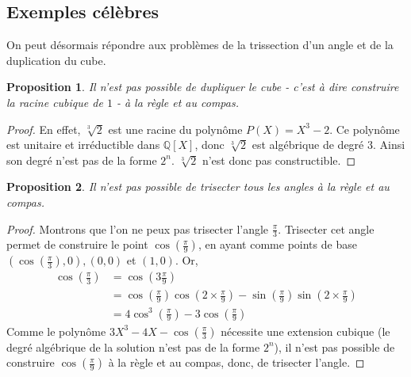 \documentclass[a4paper,12pt,french]{report}
\newtheorem{proposition}{Proposition}[section]
\begin{document}
	\subsection{Exemples célèbres}

		On peut désormais répondre aux problèmes de la trissection 
		d'un angle et de la duplication du cube.

	
	\begin{proposition}
		Il n'est pas possible de dupliquer le cube - c'est à dire construire la racine cubique de $1$ - à la règle et au compas.
	\end{proposition}
             
			\begin{proof}
			En effet, 
				\(\sqrt[3]{2}\) est une racine du polynôme 
				\(P(X)=X^{3}-2\). Ce polynôme est unitaire et 
				irréductible dans \(\mathbb{Q}[X]\), donc \(\sqrt[3]{2}\) 
				est algébrique de degré 3. Ainsi son degré n'est pas de 
				la forme \(2^{n}\). \(\sqrt[3]{2}\) n'est donc pas 
				constructible.
			\end{proof}
			
	\begin{proposition}
			Il n'est pas possible de trisecter tous les angles à la règle et au compas.
	\end{proposition}
			
			\begin{proof}
				Montrons que l'on ne peux pas trisecter l'angle $\frac{\pi}{3}$.
				Trisecter cet angle permet de construire le point $\cos (\frac{\pi}{9})$, en ayant comme points de base $(\cos (\frac{\pi}{3}),0),(0,0)$ et $(1,0)$.
				Or, 
				\[{}
				\begin{aligned}
					\cos \left(\frac{\pi}{3}\right) &= \cos \left(3\frac{\pi}{9}\right) \\
						&= \cos\left(\frac{\pi}{9}\right)\cos\left(2\times\frac{\pi}{9}\right) - \sin\left(\frac{\pi}{9}\right)\sin\left(2\times\frac{\pi}{9}\right) \\
						&= 4\cos^{3}\left(\frac{\pi}{9}\right) - 3\cos\left(\frac{\pi}{9}\right)
				\end{aligned}
				\]
				Comme le polynôme $3X^{3}-4X-\cos\left(\frac{\pi}{3}\right)$ nécessite une extension cubique (le degré algébrique de la solution n'est pas de la forme $2^{n}$), il n'est pas possible de construire $\cos\left(\frac{\pi}{9}\right)$ à la règle et au compas, donc, de trisecter l'angle.
			\end{proof}
			
		
\end{document}
